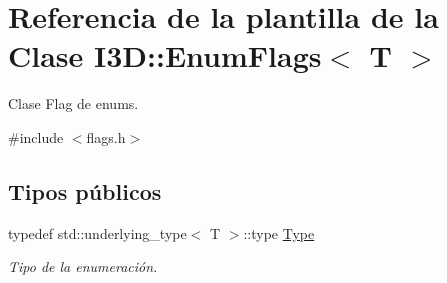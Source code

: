 \hypertarget{class_i3_d_1_1_enum_flags}{}\section{Referencia de la plantilla de la Clase I3D\+:\+:Enum\+Flags$<$ T $>$}
\label{class_i3_d_1_1_enum_flags}


Clase Flag de enums.  




{\ttfamily \#include $<$flags.\+h$>$}

\subsection*{Tipos públicos}
\begin{DoxyCompactItemize}
\item 
typedef std\+::underlying\+\_\+type$<$ T $>$\+::type \hyperlink{class_i3_d_1_1_enum_flags_a7a572435bc6e53982a3773ecaf3aad78}{Type}
\begin{DoxyCompactList}\small\item\em Tipo de la enumeración. \end{DoxyCompactList}\end{DoxyCompactItemize}
